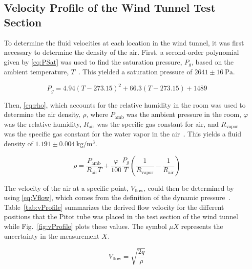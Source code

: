 \documentclass[journal,letterpaper]{IEEEtran}
\begin{document}
\subsection{Velocity Profile of the Wind Tunnel Test Section}

To determine the fluid velocities at each location in the wind tunnel, it was first necessary to determine the density of the air.
First, a second-order polynomial given by \eqref{eq:PSat} was used to find the saturation pressure, $P_g$, based on the ambient temperature, $T$~\cite{calculator}.
This yielded a saturation pressure of $2641 \pm \qty{16}{\pascal}$.

\begin{equation} \label{eq:PSat}
    P_g = 4.94(T - 273.15)^2 + 66.3(T - 273.15) + 1489
\end{equation}
\vspace{-1.5pt}

Then, \eqref{eq:rho}, which accounts for the relative humidity in the room was used to determine the air density, $\rho$, where $P_\text{amb}$ was the ambient pressure in the room, $\varphi$ was the relative humidity, $R_\text{air}$ was the specific gas constant for air, and $R_\text{vapor}$ was the specific gas constant for the water vapor in the air~\cite{calculator}.
This yields a fluid density of $1.191 \pm \qty{0.004}{\kg\per\m\cubed}$.

\begin{equation} \label{eq:rho}
    \rho = \frac{P_\text{amb}}{R_\text{air} T} + \frac{\varphi}{100}\frac{P_g}{T}\left(\frac{1}{R_\text{vapor}} - \frac{1}{R_\text{air}}\right)
\end{equation}

The velocity of the air at a specific point, $V_\text{flow}$, could then be determined by using \eqref{eq:Vflow}, which comes from the definition of the dynamic pressure~\cite{lecture}.
Table~\ref{tab:vProfile} summarizes the derived flow velocity for the different positions that the Pitot tube was placed in the test section of the wind tunnel while Fig.~\ref{fig:vProfile} plots these values. The symbol $\mu X$ represents the uncertainty in the measurement $X$.

\begin{equation} \label{eq:Vflow}
    V_\text{flow} = \sqrt{\frac{2q}{\rho}}
\end{equation}
\end{document}

